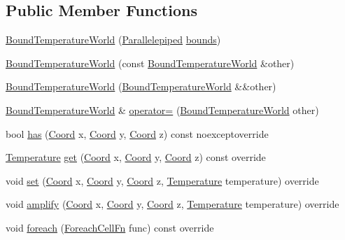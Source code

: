 \subsection*{Public Member Functions}
\begin{DoxyCompactItemize}
\item 
\hyperlink{class_bound_temperature_world_ab1843b429dc37c0c09ef0b454b9ea908}{Bound\-Temperature\-World} (\hyperlink{struct_parallelepiped}{Parallelepiped} \hyperlink{class_bound_temperature_world_a3351693a7d184365da5dfb5d833a0cb6}{bounds})
\item 
\hyperlink{class_bound_temperature_world_ae022092cb3feca841a569a1be7ab650a}{Bound\-Temperature\-World} (const \hyperlink{class_bound_temperature_world}{Bound\-Temperature\-World} \&other)
\item 
\hyperlink{class_bound_temperature_world_ae8406206a559d955ce53d18f4e2ec45b}{Bound\-Temperature\-World} (\hyperlink{class_bound_temperature_world}{Bound\-Temperature\-World} \&\&other)
\item 
\hyperlink{class_bound_temperature_world}{Bound\-Temperature\-World} \& \hyperlink{class_bound_temperature_world_a0501d4803249b0724ee87cd125f81481}{operator=} (\hyperlink{class_bound_temperature_world}{Bound\-Temperature\-World} other)
\item 
bool \hyperlink{class_bound_temperature_world_a75d2d3c631fb355de63dea3961ecd32b}{has} (\hyperlink{struct_coord}{Coord} x, \hyperlink{struct_coord}{Coord} y, \hyperlink{struct_coord}{Coord} z) const noexceptoverride
\item 
\hyperlink{struct_temperature}{Temperature} \hyperlink{class_bound_temperature_world_a1a668e9632e4179029cabad5052428fc}{get} (\hyperlink{struct_coord}{Coord} x, \hyperlink{struct_coord}{Coord} y, \hyperlink{struct_coord}{Coord} z) const override
\item 
void \hyperlink{class_bound_temperature_world_aa069691f31dd38006cfeacab94b6e94e}{set} (\hyperlink{struct_coord}{Coord} x, \hyperlink{struct_coord}{Coord} y, \hyperlink{struct_coord}{Coord} z, \hyperlink{struct_temperature}{Temperature} temperature) override
\item 
void \hyperlink{class_bound_temperature_world_a7b49bd6e07cc78f3c7a3a722d0ec5bac}{amplify} (\hyperlink{struct_coord}{Coord} x, \hyperlink{struct_coord}{Coord} y, \hyperlink{struct_coord}{Coord} z, \hyperlink{struct_temperature}{Temperature} temperature) override
\item 
void \hyperlink{class_bound_temperature_world_afac2a24af176488487ef7aaa62936ee7}{foreach} (\hyperlink{class_i_temperature_world_boundable_mixin_a370c20d79642d15e97843da972d87ba9}{Foreach\-Cell\-Fn} func) const override

\end{DoxyCompactItemize}
